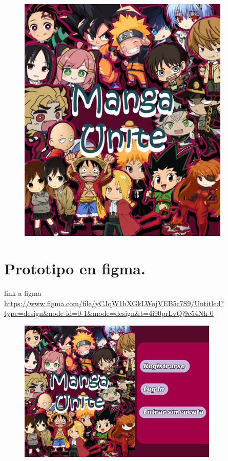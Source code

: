 \documentclass[12pt]{article}
\begin{document}
\begin{figure}[htbp]
	\centering
		\includegraphics[width=0.90\textwidth]{logo.jpg}
	\label{fig:logo}
\end{figure}

\newpage

\section{Prototipo en figma.}

\par link a figma \url{https://www.figma.com/file/yCJqW1hXGkLWojVEB5c7S9/Untitled?type=design&node-id=0-1&mode=design&t=4i90prLvQj9c54Nh-0}

\begin{figure}[htbp]
	\centering
		\includegraphics[width=0.85\textwidth]{Desktop - 1.png}
	\label{fig:Desktop - 1}
\end{figure}

\newsection
\end{document}
